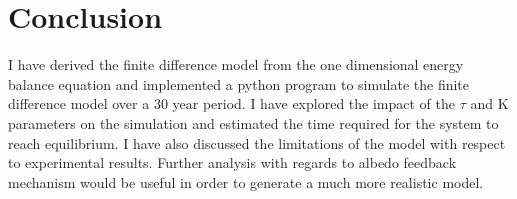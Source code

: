 \documentclass{article}%
\begin{document}
\section{Conclusion}
I have derived the finite difference model from the one dimensional energy balance equation and implemented a python program to simulate 
the finite difference model over a 30 year period. I have explored the impact of the $\tau$ and K parameters on the simulation and estimated the time required for 
the system to reach equilibrium. I have also discussed the limitations of the model with respect to experimental results. Further analysis with regards to albedo feedback mechanism would be useful in order to generate a much more 
realistic model.
%
\printbibliography
%
\end{document}

